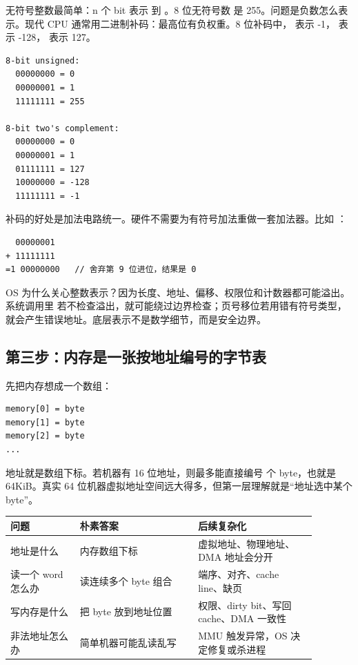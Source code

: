 无符号整数最简单：n 个 bit 表示  到 。8 位无符号数  是 255。问题是负数怎么表示。现代 CPU 通常用二进制补码：最高位有负权重。8 位补码中， 表示 -1， 表示 -128， 表示 127。

\begin{lstlisting}
8-bit unsigned:
  00000000 = 0
  00000001 = 1
  11111111 = 255

8-bit two's complement:
  00000000 = 0
  00000001 = 1
  01111111 = 127
  10000000 = -128
  11111111 = -1
\end{lstlisting}

补码的好处是加法电路统一。硬件不需要为有符号加法重做一套加法器。比如 ：

\begin{lstlisting}
  00000001
+ 11111111
=1 00000000   // 舍弃第 9 位进位，结果是 0
\end{lstlisting}

OS 为什么关心整数表示？因为长度、地址、偏移、权限位和计数器都可能溢出。系统调用里  若不检查溢出，就可能绕过边界检查；页号移位若用错有符号类型，就会产生错误地址。底层表示不是数学细节，而是安全边界。

\subsection{第三步：内存是一张按地址编号的字节表}

先把内存想成一个数组：

\begin{lstlisting}
memory[0] = byte
memory[1] = byte
memory[2] = byte
...
\end{lstlisting}

地址就是数组下标。若机器有 16 位地址，则最多能直接编号  个 byte，也就是 64KiB。真实 64 位机器虚拟地址空间远大得多，但第一层理解就是“地址选中某个 byte”。

\begin{longtable}{p{0.2\linewidth}p{0.34\linewidth}p{0.34\linewidth}}
\toprule
问题 & 朴素答案 & 后续复杂化 \\
\midrule
地址是什么 & 内存数组下标 & 虚拟地址、物理地址、DMA 地址会分开 \\
读一个 word 怎么办 & 读连续多个 byte 组合 & 端序、对齐、cache line、缺页 \\
写内存是什么 & 把 byte 放到地址位置 & 权限、dirty bit、写回 cache、DMA 一致性 \\
非法地址怎么办 & 简单机器可能乱读乱写 & MMU 触发异常，OS 决定修复或杀进程 \\
\bottomrule
\end{longtable}


